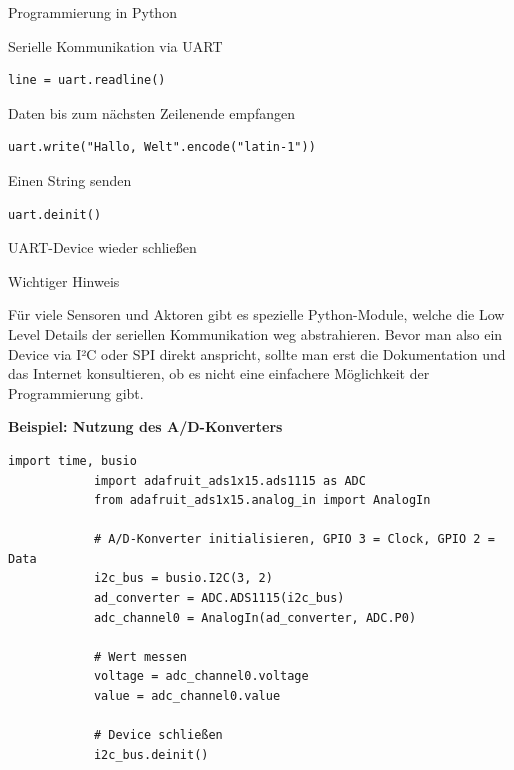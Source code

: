 {\begin{frame}{Programmierung in Python}
\begin{block}{Serielle Kommunikation via UART}
        \begin{lstlisting}[style=MethodenListeKlein, gobble=12]
            line = uart.readline()
        \end{lstlisting}
        Daten bis zum nächsten Zeilenende empfangen
        \smallskip

        \begin{lstlisting}[style=MethodenListeKlein, gobble=12]
            uart.write("Hallo, Welt".encode("latin-1"))
        \end{lstlisting}
        Einen String senden
        \smallskip

        \begin{lstlisting}[style=MethodenListeKlein, gobble=12]
            uart.deinit()
        \end{lstlisting}
        UART-Device wieder schließen
        \smallskip
    \end{block}

    \framebreak

    \begin{alertblock}{Wichtiger Hinweis}
        \smallskip
        \parbox{\textwidth}{
            Für viele Sensoren und Aktoren gibt es spezielle Python-Module, welche die
            Low Level Details der seriellen Kommunikation weg abstrahieren. Bevor man
            also ein Device via I²C oder SPI direkt anspricht, sollte man erst die
            Dokumentation und das Internet konsultieren, ob es nicht eine einfachere
            Möglichkeit der Programmierung gibt.
        }

        \bigskip
        \textbf{Beispiel: Nutzung des A/D-Konverters}

        \begin{lstlisting}[style=MethodenListeKlein, gobble=12]
            import time, busio
            import adafruit_ads1x15.ads1115 as ADC
            from adafruit_ads1x15.analog_in import AnalogIn

            # A/D-Konverter initialisieren, GPIO 3 = Clock, GPIO 2 = Data
            i2c_bus = busio.I2C(3, 2)
            ad_converter = ADC.ADS1115(i2c_bus)
            adc_channel0 = AnalogIn(ad_converter, ADC.P0)

            # Wert messen
            voltage = adc_channel0.voltage
            value = adc_channel0.value

            # Device schließen
            i2c_bus.deinit()
        \end{lstlisting}
    \end{alertblock}
\end{frame}
}

